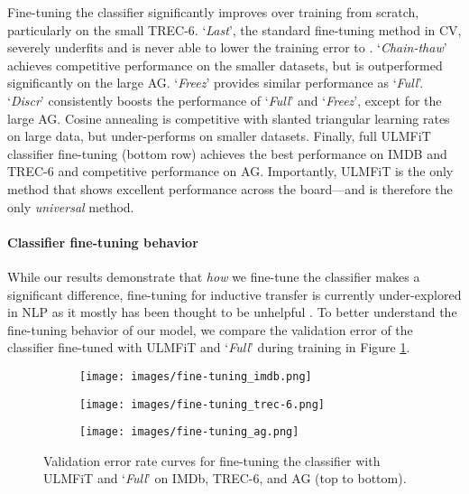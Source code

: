 \documentclass[11pt,a4paper]{article}
\begin{document}
Fine-tuning the classifier significantly improves over training from scratch, particularly on the small TREC-6. `\emph{Last}', the standard fine-tuning method in CV, severely underfits and is never able to lower the training error to . `\emph{Chain-thaw}' achieves competitive performance on the smaller datasets, but is outperformed significantly on the large AG. `\emph{Freez}' provides similar performance as `\emph{Full}'. `\emph{Discr}' consistently boosts the performance of `\emph{Full}' and `\emph{Freez}', except for the large AG. Cosine annealing is competitive with slanted triangular learning rates on large data, but under-performs on smaller datasets. Finally, full ULMFiT classifier fine-tuning (bottom row) achieves the best performance on IMDB and TREC-6 and competitive performance on AG. Importantly, ULMFiT is the only method that shows excellent performance across the board---and is therefore the only \emph{universal} method.

\paragraph{Classifier fine-tuning behavior} While our results demonstrate that \emph{how} we fine-tune the classifier makes a significant difference, fine-tuning for inductive transfer is currently under-explored in NLP as it mostly has been thought to be unhelpful \cite{Mou2016}. To better understand the fine-tuning behavior of our model, we compare the validation error of the classifier fine-tuned with ULMFiT and `\emph{Full}' during training in Figure \ref{fig:fine-tuning}.

\begin{figure}[!htb]
    \begin{subfigure}{\linewidth}
      \centering
         \texttt{[image: images/fine-tuning\_imdb.png]}
    \end{subfigure}\hspace{10cm}
    \begin{subfigure}{\linewidth}
      \centering
         \texttt{[image: images/fine-tuning\_trec-6.png]}
    \end{subfigure}
    \begin{subfigure}{\linewidth}
      \centering
         \texttt{[image: images/fine-tuning\_ag.png]}
    \end{subfigure}
    \caption{Validation error rate curves for fine-tuning the classifier with ULMFiT and `\emph{Full}' on IMDb, TREC-6, and AG (top to bottom).}
\label{fig:fine-tuning}
\end{figure}
\end{document}

